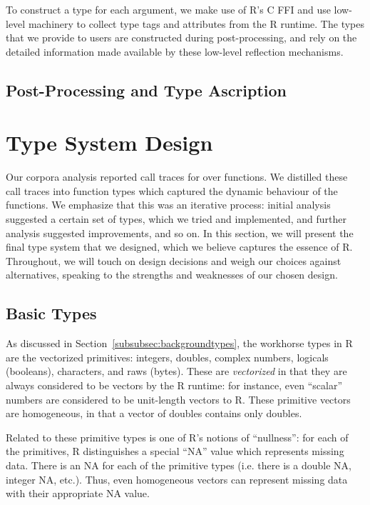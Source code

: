 \documentclass[acmsmall,review,anonymous]{acmart}\settopmatter{printfolios=true,printccs=false,printacmref=false}
\begin{document}
To construct a type for each argument, we make use of R's C FFI and use low-level machinery to collect type tags and attributes from the R runtime.
The types that we provide to users are constructed during post-processing, and rely on the detailed information made available by these low-level reflection mechanisms.

%
%
%
%
\subsection{Post-Processing and Type Ascription}



%
%
%
%
%
%
\section{Type System Design}
\label{sec:typesystemdesign}

Our corpora analysis reported  call traces for over  functions.
We distilled these call traces into function types which captured the dynamic behaviour of the functions.
We emphasize that this was an iterative process: initial analysis suggested a certain set of types, which we tried and implemented, and further analysis suggested improvements, and so on.
In this section, we will present the final type system that we designed, which we believe captures the essence of R.
Throughout, we will touch on design decisions and weigh our choices against alternatives, speaking to the strengths and weaknesses of our chosen design.

%
%
%
%
\subsection{Basic Types}
\label{subsec:basictypes}

As discussed in Section~\ref{subsubsec:backgroundtypes}, the workhorse types in R are the vectorized primitives: integers, doubles, complex numbers, logicals (booleans), characters, and raws (bytes).
These are {\it vectorized} in that they are always considered to be vectors by the R runtime: for instance, even ``scalar'' numbers are considered to be unit-length vectors to R.
These primitive vectors are homogeneous, in that a vector of doubles contains only doubles.

Related to these primitive types is one of R's notions of ``nullness'': for each of the primitives, R distinguishes a special ``NA'' value which represents missing data.
There is an NA for each of the primitive types (i.e. there is a double NA, integer NA, etc.).
Thus, even homogeneous vectors can represent missing data with their appropriate NA value.
\end{document}
